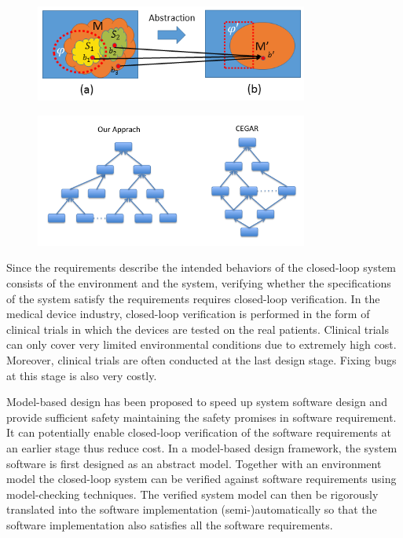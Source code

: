 \documentclass{llncs}
\begin{document}
\begin{figure}[!t]
		\centering
		\includegraphics[width=0.8\textwidth]{figs/distinction.png}
		\caption{\small }
		\label{fig:ambiguity}
\end{figure}
\begin{figure}[!t]
		\centering
		\includegraphics[width=0.8\textwidth]{figs/env_sys.png}
		\caption{\small }
		\label{fig:distinction}
\end{figure}

Since the requirements describe the intended behaviors of the closed-loop system consists of the environment and the system, verifying whether the specifications of the system satisfy the requirements requires closed-loop verification. In the medical device industry, closed-loop verification is performed in the form of clinical trials in which the devices are tested on the real patients. Clinical trials can only cover very limited environmental conditions due to extremely high cost. Moreover, clinical trials are often conducted at the last design stage. Fixing bugs at this stage is also very costly.

Model-based design has been proposed to speed up system software design and provide sufficient safety maintaining the safety promises in software requirement. It can potentially enable closed-loop verification of the software requirements at an earlier stage thus reduce cost. In a model-based design framework, the system software is first designed as an abstract model. Together with an environment model the closed-loop system can be verified against software requirements using model-checking techniques. The verified system model can then be rigorously translated into the software implementation (semi-)automatically so that the software implementation also satisfies all the software requirements.
\end{document}
